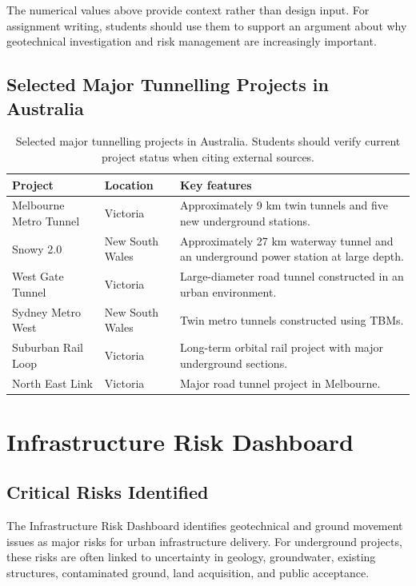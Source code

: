 \documentclass[a4paper,12pt]{article}
\begin{document}
\begin{notebox}
The numerical values above provide context rather than design input. For assignment writing, students should use them to support an argument about why geotechnical investigation and risk management are increasingly important.
\end{notebox}

\subsection{Selected Major Tunnelling Projects in Australia}

\begin{table}[H]
\centering
\small
\begin{tabularx}{\textwidth}{l l X}
\toprule
\textbf{Project} & \textbf{Location} & \textbf{Key features} \\
\midrule
Melbourne Metro Tunnel & Victoria & Approximately 9 km twin tunnels and five new underground stations. \\
Snowy 2.0 & New South Wales & Approximately 27 km waterway tunnel and an underground power station at large depth. \\
West Gate Tunnel & Victoria & Large-diameter road tunnel constructed in an urban environment. \\
Sydney Metro West & New South Wales & Twin metro tunnels constructed using TBMs. \\
Suburban Rail Loop & Victoria & Long-term orbital rail project with major underground sections. \\
North East Link & Victoria & Major road tunnel project in Melbourne. \\
\bottomrule
\end{tabularx}
\caption{Selected major tunnelling projects in Australia. Students should verify current project status when citing external sources.}
\end{table}

\section{Infrastructure Risk Dashboard}

\subsection{Critical Risks Identified}
The Infrastructure Risk Dashboard identifies geotechnical and ground movement issues as major risks for urban infrastructure delivery. For underground projects, these risks are often linked to uncertainty in geology, groundwater, existing structures, contaminated ground, land acquisition, and public acceptance.
\end{document}
